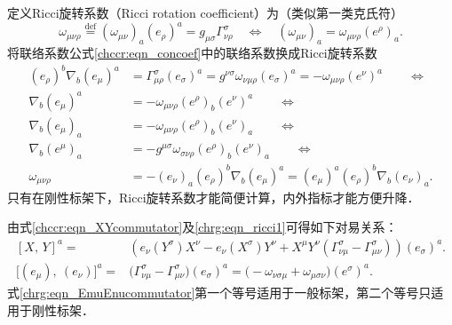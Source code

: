 定义{\heiti Ricci旋转系数}（Ricci rotation coefficient）为（类似第一类克氏符）
\begin{equation}\label{chrg:eqn_ricci0}
    \omega_{\mu\nu\rho} \overset{\mathrm {def}}{=} (\omega_{\mu\nu})_a (e_\rho)^{a}
    =g_{\mu\sigma}\Gamma^{\sigma}_{\nu\rho}
    {\quad \Leftrightarrow \quad}
    (\omega_{\mu\nu})_a  = \omega_{\mu\nu\rho} (e^\rho)_{a} .
\end{equation}
将联络系数公式\eqref{chccr:eqn_concoef}中的联络系数换成Ricci旋转系数
\begin{align}
    (e_\rho)^b \nabla _b (e_\mu)^a & = \Gamma^{\sigma}_{\mu\rho} (e_\sigma)^a
    = g^{\nu\sigma}\omega_{\nu\mu\rho} (e_\sigma)^a =-\omega_{\mu\nu\rho} (e^\nu)^a
    {\qquad \Leftrightarrow }  \label{chrg:eqn_ricci1} \\
    \nabla _b (e_\mu)^a & = -\omega_{\mu\nu\rho} (e^\rho)_b (e^\nu)^a
    {\qquad \Leftrightarrow }  \label{chrg:eqn_ricci2} \\
    \nabla _b (e_\mu)_a &  = -\omega_{\mu\nu\rho}(e^\rho)_b (e^\nu)_a
    {\qquad \Leftrightarrow }  \label{chrg:eqn_ricci3}  \\
    \nabla _b (e^\mu)_a & = -g^{\mu\sigma}\omega_{\sigma\nu\rho}(e^\rho)_b (e^\nu)_a
    {\qquad \Leftrightarrow }  \label{chrg:eqn_ricci4}  \\
    \omega_{\mu\nu\rho} & = -(e_\nu)_a (e_\rho)^b \nabla _b (e_\mu)^a
    = (e_\mu)^a  (e_\rho)^b \nabla _b (e_\nu)_a . \label{chrg:eqn_ricci5}
\end{align}
只有在刚性标架下，Ricci旋转系数才能简便计算，内外指标才能方便升降．


由式\eqref{chccr:eqn_XYcommutator}及\eqref{chrg:eqn_ricci1}可得如下对易关系：
\begin{align}
    \left[ X,\, Y \right]^a =&\left(e_\nu (Y^\sigma)X^\nu  -  e_\nu (X^\sigma) Y^\nu
    + X^\mu Y^\nu ( \Gamma^{\sigma}_{\nu\mu} - \Gamma^{\sigma}_{\mu\nu}) \right)(e_\sigma)^a .
      \label{chrg:eqn_XYcommutator-Ebase} \\
    \bigl[(e_\mu),\ (e_\nu)\bigr]^a
    =& \bigl(\Gamma^{\sigma}_{\nu\mu} - \Gamma^{\sigma}_{\mu\nu}\bigr) (e_\sigma)^a
    = \bigl(-\omega_{\nu\sigma\mu} + \omega_{\mu\sigma\nu}\bigr) (e^\sigma)^a .
      \label{chrg:eqn_EmuEnucommutator}
\end{align}
式\eqref{chrg:eqn_EmuEnucommutator}第一个等号适用于一般标架，第二个等号只适用于刚性标架． %

